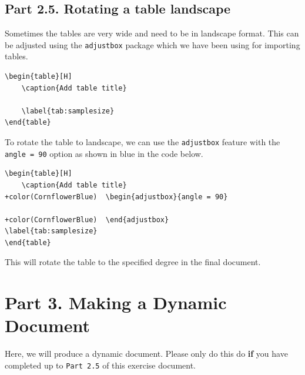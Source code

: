 \documentclass[12pts]{report}
\begin{document}
\subsection*{Part 2.5. Rotating a table landscape}

Sometimes the tables are very wide and need to be in landscape format. This can be adjusted using the \texttt{adjustbox} package which we have been using for importing tables. 

\begin{Verbatim}
\begin{table}[H]
	\caption{Add table title}
	
	\label{tab:samplesize}
\end{table}
\end{Verbatim}
To rotate the table to landscape, we can use the \texttt{adjustbox} feature with the \texttt{angle = 90} option as shown in blue in the code below.
\begin{Verbatim}[commandchars=+\(\)]
\begin{table}[H]
	\caption{Add table title}
+color(CornflowerBlue)	\begin{adjustbox}{angle = 90} 
		
+color(CornflowerBlue)	\end{adjustbox}
\label{tab:samplesize}
\end{table}
\end{Verbatim}

This will rotate the table to the specified degree in the final document. 

\section*{Part 3. Making a Dynamic Document}

Here, we will produce a dynamic document. Please only do this do \textbf{if} you have completed up to \texttt{Part 2.5} of this exercise document. 
\end{document}
